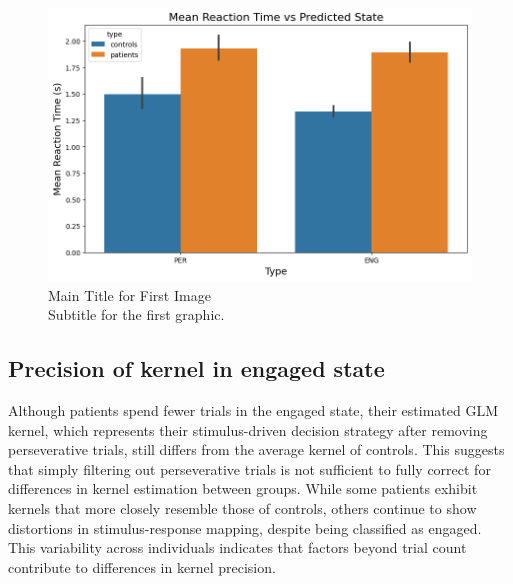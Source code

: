 \begin{figure}[H]
    \centering
    \includegraphics[width=12cm]{MainLayout/Images/chapter7/rt_state.png}
    \caption{Main Title for First Image \\ \small Subtitle for the first graphic.}
    \label{fig:rt_state}
\end{figure}

\subsection{Precision of kernel in engaged state}

Although patients spend fewer trials in the engaged state, their estimated GLM kernel, which represents their stimulus-driven decision strategy after removing perseverative trials, still differs from the average kernel of controls. This suggests that simply filtering out perseverative trials is not sufficient to fully correct for differences in kernel estimation between groups. While some patients exhibit kernels that more closely resemble those of controls, others continue to show distortions in stimulus-response mapping, despite being classified as engaged. This variability across individuals indicates that factors beyond trial count contribute to differences in kernel precision.  

